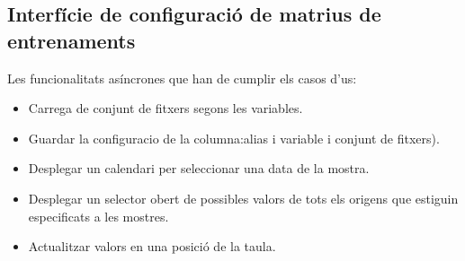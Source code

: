 \subsection{Interf\'{i}cie de configuraci\'{o} de matrius de entrenaments}
Les funcionalitats asíncrones que han de cumplir els casos d'us:
\begin{itemize}
\item Carrega de conjunt de fitxers segons les variables.
\item Guardar la configuracio de la columna:alias i variable i conjunt de fitxers).
\item Desplegar un calendari per seleccionar una data de la mostra.
\item Desplegar un selector obert de possibles valors de tots els origens que estiguin especificats a les mostres.
\item Actualitzar valors en una posició de la taula.
\end{itemize}





